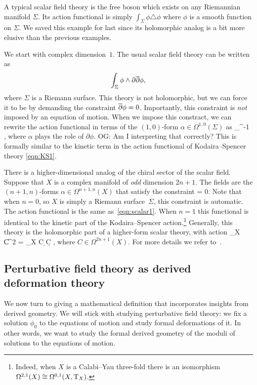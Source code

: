 \documentclass[11pt]{amsart}
\def\del{\partial}
\renewcommand{\op}{\operatorname}
\def\owen#1{{\textcolor{violet!50!black}{OG: {#1}}}}
\begin{document}
A typical scalar field theory is the free boson which exists on any Riemannian manifold $\Sigma$.
Its action functional is simply $\int_\Sigma \phi \triangle \phi$ where $\phi$ is a smooth function on $\Sigma$.
We saved this example for last since its holomorphic analog is a bit more elusive than the previous examples.

We start with complex dimension~$1$.
The usual scalar field theory can be written as 
\[
\int_{\Sigma} \phi \wedge \del \dbar \phi, 
\]
where $\Sigma$ is a Riemann surface.
This theory is not holomorphic, but we can force it to be by demanding the constraint ${\overline{\partial}} \phi = 0$.
Importantly, this constraint is \textit{not} imposed by an equation of motion.
When we impose this constract, we can rewrite the action functional in terms of the $(1,0)$-form $\alpha \in \Omega^{1,0}(\Sigma)$ as
\beqn\label{eqn:scalar1}
\int_\Sigma \alpha \wedge \dbar \del^{-1} \alpha ,
\eeqn
where $\alpha$ plays the role of $\partial \phi$.
\owen{Am I interpreting that correctly?} 
This is formally similar to the kinetic term in the action functional of Kodaira--Spencer theory \eqref{eqn:KS1}.

There is a higher-dimensional analog of the chiral sector of the scalar field.
Suppose that $X$ is a complex manifold of \textit{odd} dimension $2n+1$.
The fields are the $(n+1,n)$-forms $\alpha \in \Omega^{n+1,n}(X)$ that satisfy the constraint
\beqn
\del \alpha = 0.
\eeqn
Note that when $n=0$, so $X$ is simply a Riemann surface~$\Sigma$, this constraint is automatic.
The action functional is the same as~\eqref{eqn:scalar1}.
When $n=1$ this functional is identical to the kinetic part of the Kodaira--Spencer action.\footnote{Indeed, when $X$ is a Calabi--Yau three-fold there is an isomorphism $\Omega^{2,1}(X) \cong \Omega^{0,1}(X, {\rm T}_X)$.}
Generally, this theory is the holomorphic part of a higher-form scalar theory, with action
\beqn
\int_X \|C\|^2 \op{dvol} = \int_X C \wedge \d \star \d C , 
\eeqn
where $C \in \Omega^{2n+1}(X)$.
For more details we refer to~\cite{GRWwzw}.

\subsection{Perturbative field theory as derived deformation theory}
\label{sec: pert dfn}

We now turn to giving a mathematical definition that incorporates insights from derived geometry.
We will stick with studying perturbative field theory: 
we fix a solution $\phi_0$ to the equations of motion and study formal deformations of it.
In other words, we want to study the formal derived geometry of the moduli of solutions to the equations of motion.
\end{document}
